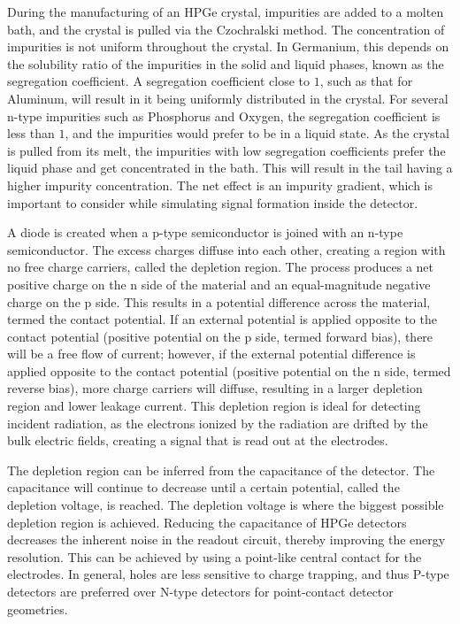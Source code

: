 During the manufacturing of an HPGe crystal, impurities are added to a molten bath, and the crystal is pulled via the Czochralski method. The concentration of impurities is not uniform throughout the crystal. In Germanium, this depends on the solubility ratio of the impurities in the solid and liquid phases, known as the segregation coefficient. A segregation coefficient close to $1$, such as that for Aluminum, will result in it being uniformly distributed in the crystal. For several n-type impurities such as Phosphorus and Oxygen, the segregation coefficient is less than $1$, and the impurities would prefer to be in a liquid state. As the crystal is pulled from its melt, the impurities with low segregation coefficients prefer the liquid phase and get concentrated in the bath. This will result in the tail having a higher impurity concentration. The net effect is an impurity gradient, which is important to consider while simulating signal formation inside the detector.

A diode is created when a p-type semiconductor is joined with an n-type semiconductor. The excess charges diffuse into each other, creating a region with no free charge carriers, called the depletion region. The process produces a net positive charge on the n side of the material and an equal-magnitude negative charge on the p side. This results in a potential difference across the material, termed the contact potential. If an external potential is applied opposite to the contact potential (positive potential on the p side, termed forward bias), there will be a free flow of current; however, if the external potential difference is applied opposite to the contact potential (positive potential on the n side, termed reverse bias), more charge carriers will diffuse, resulting in a larger depletion region and lower leakage current. This depletion region is ideal for detecting incident radiation, as the electrons ionized by the radiation are drifted by the bulk electric fields, creating a signal that is read out at the electrodes.

The depletion region can be inferred from the capacitance of the detector. The capacitance will continue to decrease until a certain potential, called the depletion voltage, is reached. The depletion voltage is where the biggest possible depletion region is achieved. Reducing the capacitance of HPGe detectors decreases the inherent noise in the readout circuit, thereby improving the energy resolution. This can be achieved by using a point-like central contact for the electrodes. In general, holes are less sensitive to charge trapping, and thus P-type detectors are preferred over N-type detectors for point-contact detector geometries.


